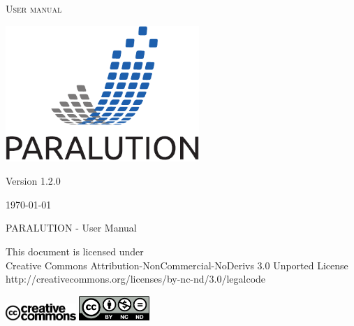 \documentclass[a4paper]{book}
\begin{document}
\begin{titlepage}

\begin{center}

\textsc{\LARGE User manual}

\vspace{1cm}
\includegraphics[width=0.55\textwidth]{./logo-paralution.pdf}
\vspace{1cm}

{\LARGE Version 1.2.0}


\vfill

{\large \today}

\end{center}

\newpage\null\thispagestyle{empty}\newpage


\newpage 

{PARALUTION - User Manual}

\vfill


%
%
\noindent
\small{This document is licensed under}\\
\small{Creative Commons Attribution-NonCommercial-NoDerivs 3.0 Unported License}\\
\small{http://creativecommons.org/licenses/by-nc-nd/3.0/legalcode}

\vspace{0.3cm}
\includegraphics[width=0.2\textwidth]{./cc/cc.pdf}
\includegraphics[width=0.2\textwidth]{./cc/by-nc-nd.pdf}


\end{titlepage}
\end{document}
